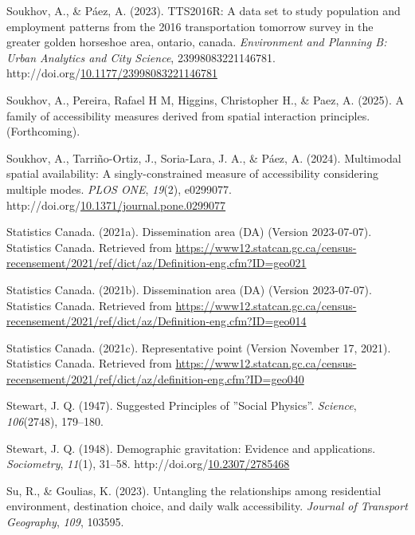 \documentclass[
11pt, %
oneside, %
english, %
singlespacing, %
]{macthesis} %
\newlength{\cslhangindent}
\newenvironment{CSLReferences}[2] %
{\begin{list}{}{%
	\setlength{\itemindent}{0pt}
	\setlength{\leftmargin}{0pt}
	\setlength{\parsep}{0pt}
	\ifodd #1
	\setlength{\leftmargin}{\cslhangindent}
	\setlength{\itemindent}{-1\cslhangindent}
	\fi
	\setlength{\itemsep}{#2\baselineskip}}}
{\end{list}}
\begin{document}
\begin{CSLReferences}{1}{0}
Soukhov, A., \& Páez, A. (2023). {TTS}2016R: A data set to study population and employment patterns from the 2016 transportation tomorrow survey in the greater golden horseshoe area, ontario, canada. \emph{Environment and Planning B: Urban Analytics and City Science}, 23998083221146781. http://doi.org/\href{https://doi.org/10.1177/23998083221146781}{10.1177/23998083221146781}

Soukhov, A., Pereira, Rafael H M, Higgins, Christopher H., \& Paez, A. (2025). A family of accessibility measures derived from spatial interaction principles. (Forthcoming).

Soukhov, A., Tarriño-Ortiz, J., Soria-Lara, J. A., \& Páez, A. (2024). Multimodal spatial availability: A singly-constrained measure of accessibility considering multiple modes. \emph{{PLOS} {ONE}}, \emph{19}(2), e0299077. http://doi.org/\href{https://doi.org/10.1371/journal.pone.0299077}{10.1371/journal.pone.0299077}

Statistics Canada. (2021a). Dissemination area (DA) (Version 2023-07-07). Statistics Canada. Retrieved from \url{https://www12.statcan.gc.ca/census-recensement/2021/ref/dict/az/Definition-eng.cfm?ID=geo021}

Statistics Canada. (2021b). Dissemination area (DA) (Version 2023-07-07). Statistics Canada. Retrieved from \url{https://www12.statcan.gc.ca/census-recensement/2021/ref/dict/az/Definition-eng.cfm?ID=geo014}

Statistics Canada. (2021c). Representative point (Version November 17, 2021). Statistics Canada. Retrieved from \url{https://www12.statcan.gc.ca/census-recensement/2021/ref/dict/az/definition-eng.cfm?ID=geo040}

Stewart, J. Q. (1947). Suggested {Principles} of ''{Social} {Physics}''. \emph{Science}, \emph{106}(2748), 179--180.

Stewart, J. Q. (1948). Demographic gravitation: Evidence and applications. \emph{Sociometry}, \emph{11}(1), 31--58. http://doi.org/\href{https://doi.org/10.2307/2785468}{10.2307/2785468}

Su, R., \& Goulias, K. (2023). Untangling the relationships among residential environment, destination choice, and daily walk accessibility. \emph{Journal of Transport Geography}, \emph{109}, 103595.


\end{CSLReferences}
\end{document}
